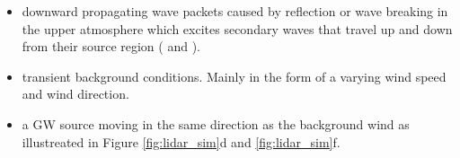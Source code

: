 \begin{itemize}
    \item downward propagating wave packets caused by reflection or wave breaking in the upper atmosphere which excites secondary waves that travel up and down from their source region (\cite[]{dornbrack_interpretation_2017} and \cite[]{vadas_mechanism_2003}).

    \item transient background conditions. Mainly in the form of a varying wind speed and wind direction.

    \item a GW source moving in the same direction as the background wind as illustreated in Figure \ref{fig:lidar_sim}d and \ref{fig:lidar_sim}f.
\end{itemize}

